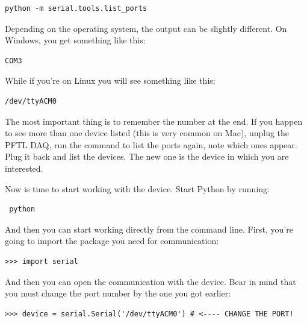 \begin{verbatim}
python -m serial.tools.list_ports
\end{verbatim}


Depending on the operating system, the output can be slightly different. On Windows, you get something like this:

\begin{verbatim}
COM3
\end{verbatim}

While if you're on Linux you will see something like this:

\begin{verbatim}
/dev/ttyACM0
\end{verbatim}

The most important thing is to remember the number at the end. If you happen to see more than one device listed (this is very common on Mac), unplug the {PFTL DAQ}, run the command to list the ports again, note which ones appear. Plug it back and list the devices. The new one is the device in which you are interested.

Now is time to start working with the device. Start Python by running:

\begin{verbatim}
 python
\end{verbatim}

And then you can start working directly from the command line. First, you're going to import the package you need for communication:

\begin{verbatim}
>>> import serial
\end{verbatim}


And then you can open the communication with the device. Bear in mind that you must change the port number by the one you got earlier:

\begin{verbatim}
>>> device = serial.Serial('/dev/ttyACM0') # <---- CHANGE THE PORT!
\end{verbatim}

